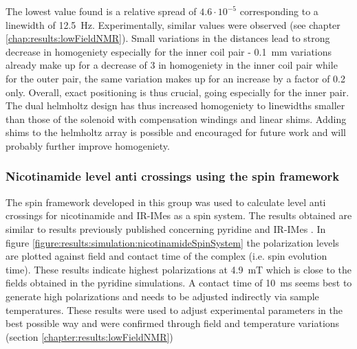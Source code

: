         The lowest value found is a relative spread of $4.6 \cdot 10^{-5}$ corresponding to a linewidth of \SI{12.5}{\hertz}. Experimentally, similar values were observed (see chapter \ref{chap:results:lowFieldNMR}). Small variations in the distances lead to strong decrease in homogeniety especially for the inner coil pair - \SI{0.1}{\milli\meter} variations already make up for a decrease of 3 in homogeniety in the inner coil pair while for the outer pair, the same variation makes up for an increase by a factor of 0.2 only. Overall, exact positioning is thus crucial, going especially for the inner pair. The dual helmholtz design has thus increased homogeniety to linewidths smaller than those of the solenoid with compensation windings and linear shims. Adding shims to the helmholtz array is possible and encouraged for future work and will probably further improve homogeniety.
        \subsubsection{Nicotinamide level anti crossings using the spin framework}
        The spin framework developed in this group was used to calculate level anti crossings for nicotinamide and IR-IMes as a spin system. The results obtained are similar to results previously published concerning pyridine and IR-IMes . In figure \ref{figure:results:simulation:nicotinamideSpinSystem} the polarization levels are plotted against field and contact time of the complex (i.e. spin evolution time). These results indicate highest polarizations at \SI{4.9}{\milli\tesla} which is close to the fields obtained in the pyridine simulations. A contact time of \SI{10}{\milli\second} seems best to generate high polarizations and needs to be adjusted indirectly via sample temperatures. These results were used to adjust experimental parameters in the best possible way and were confirmed through field and temperature variations (section \ref{chapter:results:lowFieldNMR})

